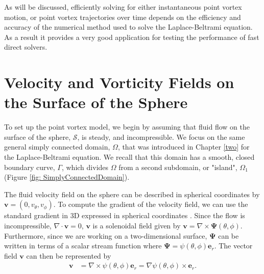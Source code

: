 \documentclass{sfuthesis}
\begin{document}
As will be discussed, efficiently solving for either instantaneous point vortex motion, or point vortex trajectories over time depends on the efficiency and accuracy of the numerical method used to solve the Laplace-Beltrami equation. As a result it provides a very good application for testing the performance of fast direct solvers.

\section{Velocity and Vorticity Fields on the Surface of the Sphere}
\label{sec: VelVortSphere}

To set up  the point vortex model, we begin by assuming that fluid flow on the surface of the sphere, $\mathcal{S}$, is steady, and incompressible. We focus on the same general simply connected domain, $\Omega$, that was introduced in Chapter \ref{two} for the Laplace-Beltrami equation. We recall that this domain has a smooth, closed boundary curve, $\Gamma$, which divides $\Omega$ from a second subdomain, or "island", ${\Omega}_1$ (Figure \ref{fig: SimplyConnectedDomain}). 

The fluid velocity field on the sphere can be described in spherical coordinates by $\mathbf{v}=(0,v_\theta, v_\phi)$. To compute the gradient of the velocity field, we can use the standard gradient in 3D expressed in spherical coordinates \cite{GemmNigStein2008}. Since the flow is incompressible, $\nabla \cdot \mathbf{v} = 0$, $\mathbf{v}$ is a solenoidal field given by $\mathbf{v}=\nabla \times \bm{\Psi}(\theta,\phi)$. Furthermore, since we are working on a two-dimensional surface, $\bm{\Psi}$ can be written in terms of a scalar stream function where $\bm{\Psi}=\psi(\theta,\phi)\mathbf{e}_r$.  The vector field $\mathbf{v}$ can then be represented by 
\begin{align*}
	\mathbf{v}&=\nabla \times \psi(\theta,\phi){\mathbf{e}}_r =\nabla\psi(\theta, \phi) \times {\mathbf{e}}_r.
\end{align*}
\end{document}
